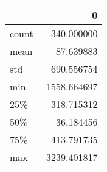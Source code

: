 \begin{tabular}{lr}
\toprule
{} &            0 \\
\midrule
count &   340.000000 \\
mean  &    87.639883 \\
std   &   690.556754 \\
min   & -1558.664697 \\
25\%   &  -318.715312 \\
50\%   &    36.184456 \\
75\%   &   413.791735 \\
max   &  3239.401817 \\
\bottomrule
\end{tabular}
